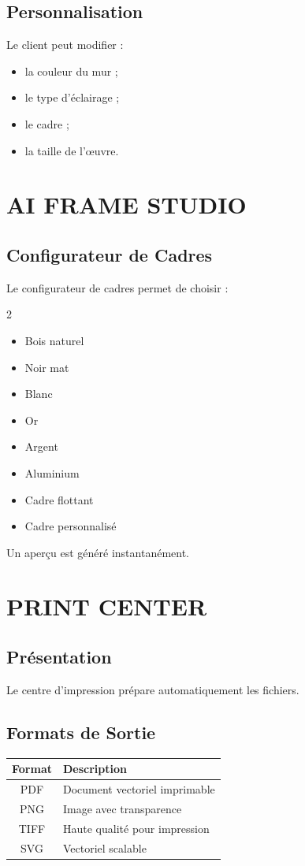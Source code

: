 \documentclass[12pt,a4paper,oneside]{book}
\begin{document}
\section{Personnalisation}
Le client peut modifier :
\begin{itemize}
\item la couleur du mur ;
\item le type d'éclairage ;
\item le cadre ;
\item la taille de l'œuvre.
\end{itemize}

\chapter{AI FRAME STUDIO}

\section{Configurateur de Cadres}
Le configurateur de cadres permet de choisir :
\begin{multicols}{2}
\begin{itemize}
\item Bois naturel
\item Noir mat
\item Blanc
\item Or
\item Argent
\item Aluminium
\item Cadre flottant
\item Cadre personnalisé
\end{itemize}
\end{multicols}

Un aperçu est généré instantanément.

\chapter{PRINT CENTER}

\section{Présentation}
Le centre d'impression prépare automatiquement les fichiers.

\section{Formats de Sortie}
\begin{center}
\begin{tabular}{|c|p{10cm}|}
\hline
\rowcolor{electronblue}
\color{white}\textbf{Format} & \color{white}\textbf{Description} \\
\hline
PDF & Document vectoriel imprimable \\
\hline
PNG & Image avec transparence \\
\hline
TIFF & Haute qualité pour impression \\
\hline
SVG & Vectoriel scalable \\
\hline
\end{tabular}
\end{center}
\end{document}
